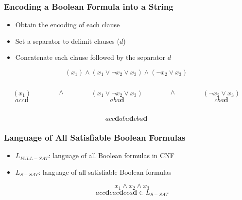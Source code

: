 \documentclass{beamer}
\begin{document}
\begin{frame}
    \frametitle{Encoding a Boolean Formula into a String}

    \begin{itemize}
        \item Obtain the encoding of each clause
              \pause
        \item Set a separator to delimit clauses ($d$)
              \pause
        \item Concatenate each clause followed by the separator $d$
    \end{itemize}

    \pause

    \begin{Large}
        $$(x_1)\wedge (x_1\vee \neg x_2 \vee x_3)\wedge (\neg x_2\vee x_3)$$

        \pause

        \begin{columns}
            \begin{column}{1cm}
                $$(x_1)$$
                $$acc\mathbf{d}$$
            \end{column}
            \pause
            \begin{column}{0.2cm}
                $$\wedge$$
                $$\ $$
            \end{column}
            \begin{column}{3cm}
                $$(x_1\vee \neg x_2 \vee x_3)$$
                $$aba\mathbf{d}$$
            \end{column}
            \pause
            \begin{column}{0.2cm}
                $$\wedge$$
                $$\ $$
            \end{column}
            \begin{column}{2cm}
                $$(\neg x_2\vee x_3)$$
                $$cba\mathbf{d}$$
            \end{column}
        \end{columns}
        \pause

        $$acc\mathbf{d}aba\mathbf{d}cba\mathbf{d}$$
    \end{Large}
\end{frame}

\begin{frame}
    \frametitle{Language of All Satisfiable Boolean Formulas}

    \begin{itemize}
        \item $L_{FULL-SAT}$: language of all Boolean formulas in CNF
              \pause
        \item $L_{S-SAT}$: language of all satisfiable Boolean formulas
              \pause
              \begin{Large}
                  $$x_1\wedge x_2 \wedge x_3$$
                  $$acc\mathbf{d}cac\mathbf{d}cca\mathbf{d}\in L_{S-SAT}$$
              \end{Large}
    \end{itemize}
\end{frame}
\end{document}
